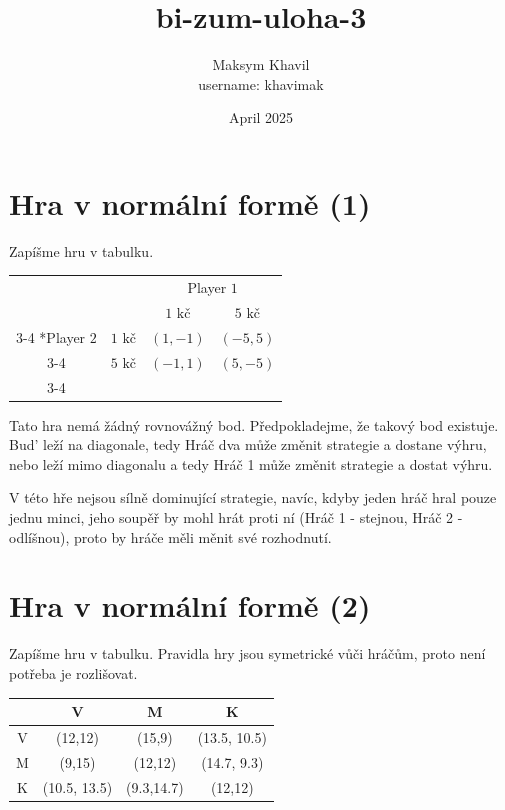 \documentclass{article}
\title{bi-zum-uloha-3}
\author{Maksym Khavil\\username: khavimak}
\date{April 2025}
\begin{document}
\maketitle

\section{Hra v normální formě (1)}

Zapíšme hru v tabulku.

  \begin{table}[h!]
    \setlength{\extrarowheight}{2pt}
    \begin{tabular}{cc|c|c|}
      & \multicolumn{1}{c}{} & \multicolumn{2}{c}{Player $1$}\\
      & \multicolumn{1}{c}{} & \multicolumn{1}{c}{$1 \text{ kč}$}  & \multicolumn{1}{c}{$5 \text{ kč}$} \\\cline{3-4}
      \multirow{2}*{Player $2$}  & $1 \text{ kč}$ & $(1,-1)$ & $(-5,5)$ \\\cline{3-4}
      & $5 \text{ kč}$ & $(-1,1)$ & $(5,-5)$ \\\cline{3-4}
    \end{tabular}
  \end{table}

  Tato hra nemá žádný rovnovážný bod. Předpokladejme, že takový bod existuje. Bud' leží na diagonale, tedy Hráč dva může změnit strategie a dostane výhru, nebo leží mimo diagonalu a tedy Hráč 1 může změnit strategie a dostat výhru.

  V této hře nejsou sílně dominující strategie, navíc, kdyby jeden hráč hral pouze jednu minci, jeho soupěř by mohl hrát proti ní (Hráč 1 - stejnou, Hráč 2 - odlíšnou), proto by hráče měli měnit své rozhodnutí.

\section{Hra v normální formě (2)}
Zapíšme hru v tabulku. Pravidla hry jsou symetrické vůči hráčům, proto není potřeba je rozlišovat.
\begin{center}
\begin{tabular}{|c|c|c|c|}
\hline
 & V & M & K \\
\hline
V & (12,12) & (15,9) & (13.5, 10.5) \\
\hline
M & (9,15) & (12,12) & (14.7, 9.3) \\
\hline
K & (10.5, 13.5) & (9.3,14.7) & (12,12) \\
\hline
\end{tabular}
\end{center}
\end{document}
